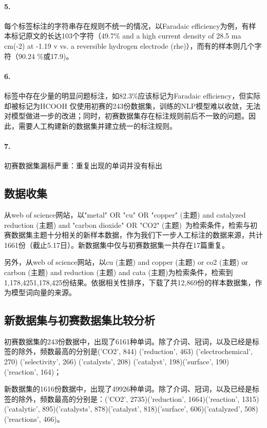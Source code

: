 \documentclass{article}
\begin{document}
\paragraph{5.}每个标签标注的字符串存在规则不统一的情况，以Faradaic efficiency为例，有样本标记原文的长达103个字符（49.7\% and a high current density of 28.5 ma cm(-2) at -1.19 v vs. a reversible hydrogen electrode (rhe)），而有的样本则几个字符（90.24 \%或17.9)。


\paragraph{6.}标签中存在少量的明显问题标注，如82.3\%应该标记为Faradaic efficiency，但实际却被标记为HCOOH
仅使用初赛的243份数据集，训练的NLP模型难以收敛，无法对模型做进一步的改进；同时，初赛数据集存在标注规则前后不一致的问题。因此，需要人工构建新的数据集并建立统一的标注规则。
\paragraph{7.}初赛数据集漏标严重：重复出现的单词并没有标出

\subsection{数据收集}
从web of science网站，以"metal" OR "cu" OR "copper" (主题) and catalyzed reduction (主题) and "carbon dioxide" OR "CO2" (主题) 为检索条件，检索与初赛数据集主题十分相关的新样本数据，作为我们下一步人工标注的数据来源，共计1661份（截止5.17日）。新数据集中仅与初赛数据集一共存在17篇重复。


另外，从web of science网站，以cu (主题) and copper (主题) or co2 (主题) or carbon (主题) and reduction (主题) and cata (主题)为检索条件，检索到1,178,4251,178,425份结果。依据相关性排序，下载了共12,869份的样本数据集，作为模型词向量的来源。
\subsection{新数据集与初赛数据集比较分析}
初赛数据集的243份数据中，出现了6161种单词。除了介词、冠词，以及已经是标签的除外，频数最高的分别是('CO2', 844) ('reduction', 463) ('electrochemical', 270) ('selectivity', 266) ('catalysts', 208) ('catalyst', 198)('surface', 190)('reaction', 164)；


新数据集的1616份数据中，出现了49926种单词。除了介词、冠词，以及已经是标签的除外，频数最高的分别是：('CO2', 2735)('reduction', 1664)('reaction', 1315)('catalytic', 895)('catalysts', 878)('catalyst', 818)('surface', 606)('catalyzed', 508)('reactions', 466)。
\end{document}
